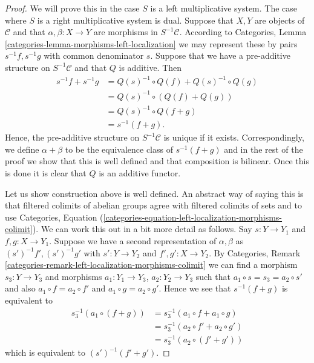 \begin{proof}
We will prove this in the case $S$ is a left multiplicative system.
The case where $S$ is a right multiplicative system is dual.
Suppose that $X, Y$ are objects of $\mathcal{C}$ and that
$\alpha, \beta : X \to Y$ are morphisms in $S^{-1}\mathcal{C}$. According to
Categories, Lemma \ref{categories-lemma-morphisms-left-localization}
we may represent these by pairs $s^{-1}f, s^{-1}g$ with common denominator $s$.
Suppose that we have a pre-additive structure on $S^{-1}\mathcal{C}$ and
that $Q$ is additive. Then
\begin{align*}
s^{-1}f+s^{-1}g
&=Q(s)^{-1}\circ Q(f)+Q(s)^{-1}\circ Q(g)\\
&=Q(s)^{-1}\circ(Q(f)+Q(g))\\
&=Q(s)^{-1}\circ Q(f+g)\\
&=s^{-1}(f+g).
\end{align*}
Hence, the pre-additive structure on $S^{-1}\mathcal{C}$ is unique if it
exists. Correspondingly, we define $\alpha + \beta$ to be the
equivalence class of $s^{-1}(f + g)$ and in the rest of the proof we show
that this is well defined and that composition is bilinear.
Once this is done it is clear that $Q$ is an additive functor.

\medskip\noindent
Let us show construction above is well defined.
An abstract way of saying this is that filtered colimits of
abelian groups agree with filtered colimits of sets and to use
Categories,
Equation (\ref{categories-equation-left-localization-morphisms-colimit}).
We can work this out in a bit more detail as follows.
Say $s : Y \to Y_1$ and $f, g : X \to Y_1$. Suppose we have a second
representation of $\alpha, \beta$ as $(s')^{-1}f', (s')^{-1}g'$ with
$s' : Y \to Y_2$ and $f', g' : X \to Y_2$. By
Categories, Remark \ref{categories-remark-left-localization-morphisms-colimit}
we can find a morphism $s_3 : Y \to Y_3$ and morphisms
$a_1 : Y_1 \to Y_3$, $a_2 : Y_2 \to Y_3$ such that
$a_1 \circ s = s_3 = a_2 \circ s'$ and also
$a_1 \circ f = a_2 \circ f'$ and $a_1 \circ g = a_2 \circ g'$.
Hence we see that $s^{-1}(f + g)$ is equivalent to
\begin{align*}
s_3^{-1}(a_1 \circ (f + g)) & =
s_3^{-1}(a_1 \circ f + a_1 \circ g) \\
& = s_3^{-1}(a_2 \circ f' + a_2 \circ g') \\
& = s_3^{-1}(a_2 \circ (f' + g'))
\end{align*}
which is equivalent to $(s')^{-1}(f' + g')$.


\end{proof}
